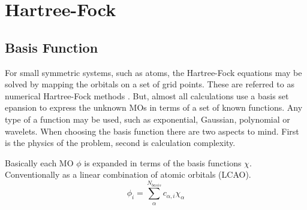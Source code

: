 \chapter{Hartree-Fock}

\section{Basis Function}
For small symmetric systems, such as atoms, the Hartree-Fock equations may be solved by mapping the orbitals on a set of grid points. These are referred to as numerical Hartree-Fock methods \cite{jensen07}. But, almost all calculations use a basis set epansion to express the unknown MOs in terms of a set of known functions. Any type of a function may be used, such as exponential, Gaussian, polynomial or wavelets. When choosing the basis function there are two aspects to mind. First is the physics of the problem, second is calculation complexity.

Basically each MO $\phi$ is expanded in terms of the basis functions $\chi$. Conventionally as a linear combination of atomic orbitals (LCAO).
\begin{equation}
    \phi_i = \sum_{\alpha}^{N_{basis}}c_{\alpha,i}\chi_{\alpha}
\end{equation} 
